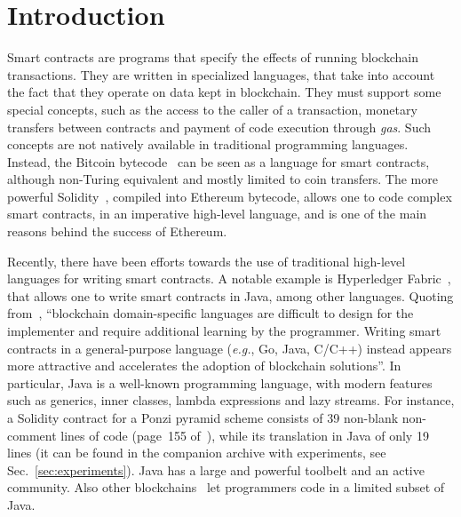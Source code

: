 \section{Introduction}\label{sec:introduction}

Smart contracts are programs that specify the effects of running blockchain transactions.
They are written in specialized languages, that take into account
the fact that they operate on data kept in blockchain. They must
support some special concepts, such as the access to the caller of a transaction,
monetary transfers between contracts
and payment of code execution through \emph{gas}.
Such concepts are not natively available
in traditional programming languages.
Instead, the Bitcoin bytecode~\cite{Antonopoulos17,Nakamoto08}
can be seen as a language for smart contracts,
although non-Turing equivalent and mostly limited to coin transfers. The more
powerful Solidity~\cite{AntonopoulosW18},
compiled into Ethereum bytecode, allows one to code
complex smart contracts, in an imperative high-level language, and is
one of the main reasons behind the success of Ethereum.

Recently, there have been efforts towards the use of traditional
high-level languages for writing smart contracts.
A notable example is Hyperledger Fabric~\cite{AndroulakiBBCCC18,Vukolic17}, that allows one
to write smart contracts in Java, among other languages. Quoting from~\cite{AndroulakiBBCCC18},
``blockchain domain-specific languages are difficult to design for the implementer
and require additional learning by the programmer. Writing smart contracts
in a general-purpose language (\emph{e.g.}, Go, Java, C/C++) instead
appears more attractive and accelerates the adoption of blockchain solutions''.
In particular, Java is a well-known programming language,
with modern features such as generics, inner classes, lambda
expressions and lazy streams. For instance, a Solidity contract
for a Ponzi pyramid scheme consists of 39 non-blank non-comment lines of code
(page~155 of~\cite{IyerD18}), while its translation in Java of only 19 lines
(it can be found in the companion archive
with experiments, see Sec.~\ref{sec:experiments}).
Java has a large and powerful toolbelt and an active community.
Also other blockchains~\cite{aion,aion_example_contract,neo,neo_contract,Spoto19}
let programmers code in a limited subset of Java.

